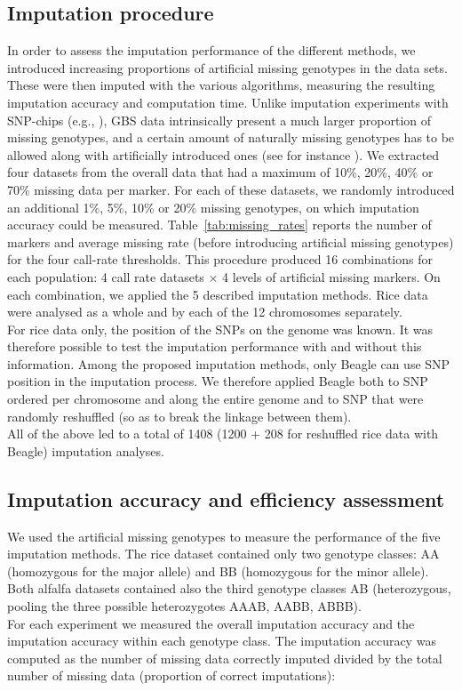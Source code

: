 \subsection{Imputation procedure}
\label{sec:imputation_procedure}
In order to assess the imputation performance of the different methods, we introduced increasing proportions of artificial missing genotypes in the data sets. These were then imputed with the various algorithms, measuring the resulting imputation accuracy and computation time. Unlike imputation experiments with SNP-chips (e.g., \cite{hickey_factors_2012}), GBS data intrinsically present a much larger proportion of missing genotypes, and a certain amount of naturally missing genotypes has to be allowed along with artificially introduced ones (see for instance \cite{rutkoski_imputation_2013}). We extracted four datasets from the overall data that had a maximum of 10\%, 20\%, 40\% or 70\% missing data per marker. For each of these datasets, we randomly introduced an additional 1\%, 5\%, 10\% or 20\% missing genotypes, on which imputation accuracy could be measured. Table~\ref{tab:missing_rates} reports the number of markers and average missing rate (before introducing artificial missing genotypes) for the four call-rate thresholds. This procedure produced 16 combinations for each population: 4 call rate datasets $\times$ 4 levels of artificial missing markers. On each combination, we applied the 5 described imputation methods. Rice data were analysed as a whole and by each of the 12 chromosomes separately. \\
For rice data only, the position of the SNPs on the genome was known. It was therefore possible to test the imputation performance with and without this information. Among the proposed imputation methods, only Beagle can use SNP position in the imputation process. We therefore applied Beagle both to SNP ordered per chromosome and along the entire genome and to SNP that were randomly reshuffled (so as to break the linkage between them). \\
All of the above led to a total of 1408 (1200 + 208 for reshuffled rice data with Beagle) imputation analyses.



\subsection{Imputation accuracy and efficiency assessment}
\label{sec:imputation_accuracy_and_efficiency_assessment}
We used the artificial missing genotypes to measure the performance of the five imputation methods. The rice dataset contained only two genotype classes: AA (homozygous for the major allele) and BB (homozygous for the minor allele). Both alfalfa datasets contained also the third genotype classes AB (heterozygous, pooling the three possible heterozygotes AAAB, AABB, ABBB).\\
For each experiment we measured the overall imputation accuracy and the imputation accuracy within each genotype class. The imputation accuracy was computed as the number of missing data correctly imputed divided by the total number of missing data (proportion of correct imputations):

